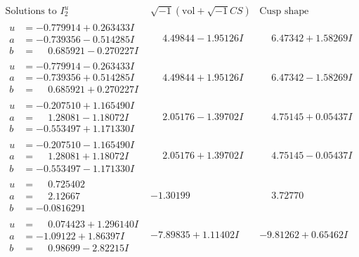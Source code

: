 \documentclass[1p]{elsarticle_modified}
\theoremstyle{definition}
\newcommand{\I}{\sqrt{-1}}
\begin{document}
$$\begin{array}{c|c|c}  
\text{Solutions to }I^u_{2}& \I (\text{vol} + \sqrt{-1}CS) & \text{Cusp shape}\\
 \hline 
\begin{aligned}
u &= -0.779914 + 0.263433 I \\
a &= -0.739356 - 0.514285 I \\
b &= \phantom{-}0.685921 - 0.270227 I\end{aligned}
 & \phantom{-}4.49844 - 1.95126 I & \phantom{-}6.47342 + 1.58269 I \\ \hline\begin{aligned}
u &= -0.779914 - 0.263433 I \\
a &= -0.739356 + 0.514285 I \\
b &= \phantom{-}0.685921 + 0.270227 I\end{aligned}
 & \phantom{-}4.49844 + 1.95126 I & \phantom{-}6.47342 - 1.58269 I \\ \hline\begin{aligned}
u &= -0.207510 + 1.165490 I \\
a &= \phantom{-}1.28081 - 1.18072 I \\
b &= -0.553497 + 1.171330 I\end{aligned}
 & \phantom{-}2.05176 - 1.39702 I & \phantom{-}4.75145 + 0.05437 I \\ \hline\begin{aligned}
u &= -0.207510 - 1.165490 I \\
a &= \phantom{-}1.28081 + 1.18072 I \\
b &= -0.553497 - 1.171330 I\end{aligned}
 & \phantom{-}2.05176 + 1.39702 I & \phantom{-}4.75145 - 0.05437 I \\ \hline\begin{aligned}
u &= \phantom{-}0.725402\phantom{ +0.000000I} \\
a &= \phantom{-}2.12667\phantom{ +0.000000I} \\
b &= -0.0816291\phantom{ +0.000000I}\end{aligned}
 & -1.30199\phantom{ +0.000000I} & \phantom{-}3.72770\phantom{ +0.000000I} \\ \hline\begin{aligned}
u &= \phantom{-}0.074423 + 1.296140 I \\
a &= -1.09122 + 1.86397 I \\
b &= \phantom{-}0.98699 - 2.82215 I\end{aligned}
 & -7.89835 + 1.11402 I & -9.81262 + 0.65462 I \\ \hline\begin{aligned}

\end{aligned}
\end{array}$$
\end{document}
